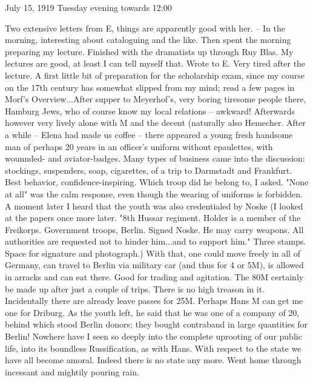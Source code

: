 July 15, 1919
Tuesday evening towards 12:00

Two extensive letters from E, things are apparently good with her. -- In the morning, interesting  about cataloguing and the like. Then spent the morning preparing my lecture. Finished with the dramatists up through Ruy Blas. My lectures are good, at least I can tell myself that. Wrote to E. Very tired after the lecture. A first little bit of preparation for the scholarship exam, since my course on the 17th century has somewhat slipped from my mind; read a few pages in Morf's Overview...After supper to Meyerhof's, very boring tiresome people there, Hamburg Jews, who of course know my local relations -- awkward! Afterwards however very lively alone with M and the decent (naturally also Hemecher. After a while -- Elena had made us coffee -- there appeared a young fresh handsome man of perhaps 20 years in an officer's uniform without epaulettes, with wounnded- and aviator-badges. Many types of business came into the discussion: stockings, suspenders, soap, cigarettes, of a trip to Darmstadt and Frankfurt. Best behavior, confidence-inspiring. Which troop did he belong to, I asked. "None at all" was the calm response, even though the wearing of uniforms is forbidden. A moment later I heard that the youth was also credentialed by Noske (I looked at the papers once more later. "8th Hussar regiment. Holder is a member of the Freikorps. Government troops, Berlin. Signed Noske. He may carry weapons. All authorities are requested not to hinder him...and to support him." Three stamps. Space for signature and photograph.) With that, one could move freely in all of Germany, can travel to Berlin via military car (and thus for 4 or 5M), is allowed in arracks and can eat there. Good for trading and agitation. The 80M certainly be made up after just a couple of trips. There is no high treason in it. Incidentally there are already leave passes for 25M. Perhaps Hans M can get me one for Driburg. As the youth left, he said that he was one of a company of 20, behind which stood Berlin donors; they bought contraband in large quantities for Berlin! \missing Nowhere have I seen so deeply into the complete uprooting of our public life, into its boundless Russification, as with Hans. With respect to the state we have all become amoral. Indeed there is no state any more. Went home through incessant and mightily pouring rain.